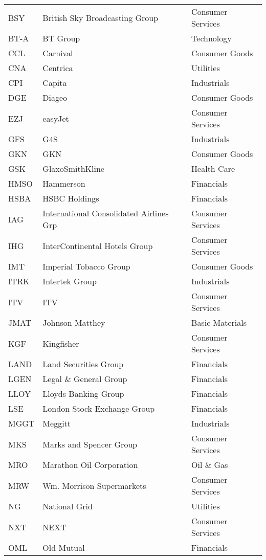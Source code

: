 \begin{center}
\begin{longtable}{|l|l|l|}
    BSY   & British Sky Broadcasting Group & Consumer Services \\
    BT-A  & BT Group & Technology \\
    CCL   & Carnival & Consumer Goods \\
    CNA   & Centrica & Utilities \\
    CPI   & Capita & Industrials \\
    DGE   & Diageo & Consumer Goods \\
    EZJ   & easyJet & Consumer Services \\
    GFS   & G4S   & Industrials \\
    GKN   & GKN   & Consumer Goods \\
    GSK   & GlaxoSmithKline & Health Care \\
    HMSO  & Hammerson & Financials \\
    HSBA  & HSBC Holdings & Financials \\
    IAG   & International Consolidated Airlines Grp & Consumer Services \\
    IHG   & InterContinental Hotels Group & Consumer Services \\
    IMT   & Imperial Tobacco Group & Consumer Goods \\
    ITRK  & Intertek Group & Industrials \\
    ITV   & ITV   & Consumer Services \\
    JMAT  & Johnson Matthey & Basic Materials \\
    KGF   & Kingfisher & Consumer Services \\
    LAND  & Land Securities Group & Financials \\
    LGEN  & Legal \& General Group & Financials \\
    LLOY  & Lloyds Banking Group & Financials \\
    LSE   & London Stock Exchange Group & Financials \\
    MGGT  & Meggitt & Industrials \\
    MKS   & Marks and Spencer Group & Consumer Services \\
    MRO   & Marathon Oil Corporation & Oil \& Gas \\
    MRW   & Wm. Morrison Supermarkets & Consumer Services \\
    NG    & National Grid & Utilities \\
    NXT   & NEXT  & Consumer Services \\
    OML   & Old Mutual & Financials \\

\end{longtable}
\end{center}
